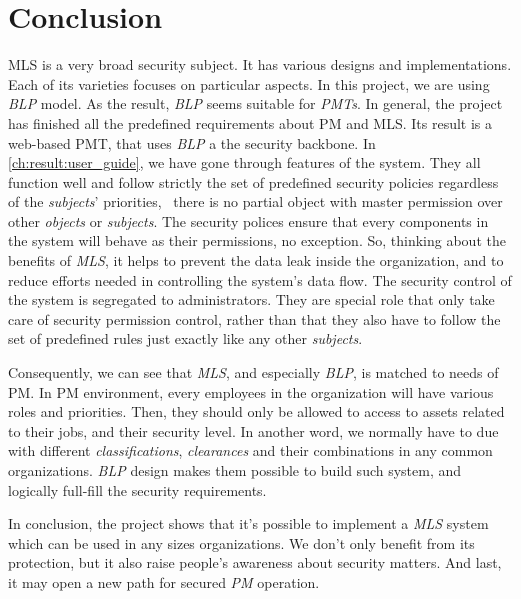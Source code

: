 
\chapter{Conclusion} %

\label{ch:conclusion} 

MLS is a very broad security subject.
It has various designs and implementations.
Each of its varieties focuses on particular aspects.
In this project, we are using \emph{BLP} model.
As the result, \emph{BLP} seems suitable for \emph{PMTs}.
In general, the project has finished all the predefined requirements about PM and MLS.
Its result is a web-based PMT, that uses \emph{BLP} a the security backbone.
In \autoref{ch:result:user_guide}, we have gone through features of the system.
They all function well and follow strictly the set of predefined security policies regardless of the \emph{subjects}' priorities, \ie\ there is no partial object with master permission over other \emph{objects} or \emph{subjects}.
The security polices ensure that every components in the system will behave as their permissions, no exception.
So, thinking about the benefits of \emph{MLS}, it helps to prevent the data leak inside the organization, and to reduce efforts needed in controlling the system's data flow.
The security control of the system is segregated to administrators.
They are special role that only take care of security permission control, rather than that they also have to follow the set of predefined rules just exactly like any other \emph{subjects}.

Consequently, we can see that \emph{MLS}, and especially \emph{BLP}, is matched to needs of PM.
In PM environment, every employees in the organization will have various roles and priorities.
Then, they should only be allowed to access to assets related to their jobs, and their security level.
In another word, we normally have to due with different \emph{classifications}, \emph{clearances} and their combinations in any common organizations.
\emph{BLP} design makes them possible to build such system, and logically full-fill the security requirements.

In conclusion, the project shows that it's possible to implement a \emph{MLS} system which can be used in any sizes organizations.
We don't only benefit from its protection, but it also raise people's awareness about security matters.
And last, it may open a new path for secured \emph{PM} operation.
